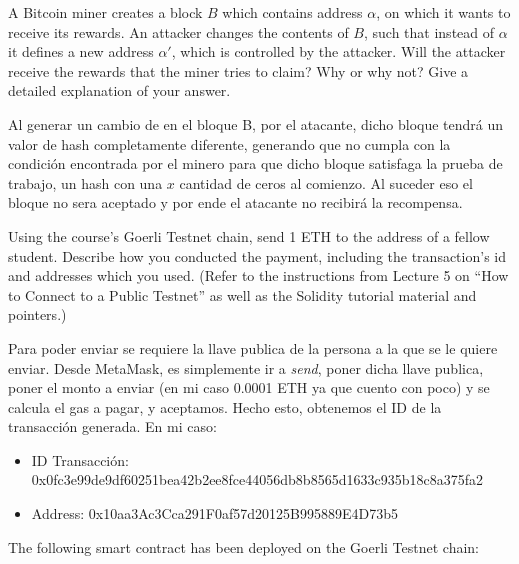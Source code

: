 \documentclass[12pt,addpoints,answers]{exam}
\begin{document}
\begin{questions}
\newpage

\question[10] A Bitcoin miner creates a block $B$ which contains address $\alpha$, on which it wants to receive its rewards. An attacker changes the contents of $B$, such that instead of $\alpha$ it defines a new address $\alpha'$, which is controlled by the attacker. Will the attacker receive the rewards that the miner tries to claim? Why or why not? Give a detailed explanation of your answer.

\begin{solution} %
Al generar un cambio de en el bloque B, por el atacante, dicho bloque tendrá un valor
de hash completamente diferente, generando que no cumpla con la condición encontrada por
el minero para que dicho bloque satisfaga la prueba de trabajo, un hash con una $x$
cantidad de ceros al comienzo.
Al suceder eso el bloque no sera aceptado y por ende el atacante no recibirá la recompensa.
\end{solution}

\newpage

\question[10] Using the course’s Goerli  Testnet chain, send 1 ETH to the address of a fellow student. Describe how you conducted the payment, including the transaction’s id and addresses which you used. (Refer to the instructions from Lecture 5 on ``How to Connect to a Public Testnet'' as well as the Solidity tutorial material and pointers.)

\begin{solution} %
Para poder enviar se requiere la llave publica de la persona a la que se le quiere enviar.
    Desde MetaMask, es simplemente ir a \textit{send}, poner dicha llave publica, poner el monto
    a enviar (en mi caso 0.0001 ETH ya que cuento con poco) y se calcula el gas a pagar, y
    aceptamos.
    Hecho esto, obtenemos el ID de la transacción generada.
    En mi caso:
    \begin{itemize}
        \item ID Transacción: 0x0fc3e99de9df60251bea42b2ee8fce44056db8b8565d1633c935b18c8a375fa2
        \item Address: 0x10aa3Ac3Cca291F0af57d20125B995889E4D73b5
    \end{itemize}
\end{solution}

\newpage

\question The following smart contract has been deployed on the Goerli Testnet chain:

{\footnotesize

}
\end{questions}
\end{document}
